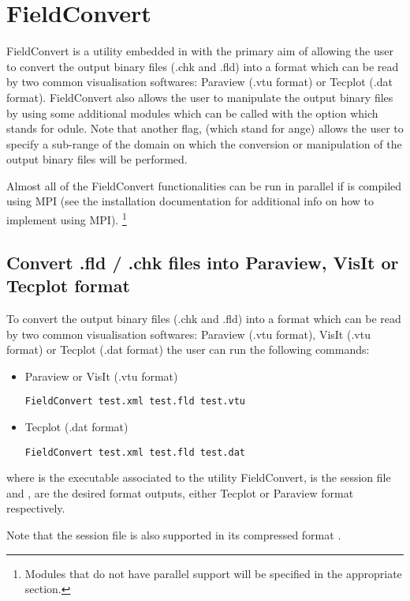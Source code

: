 \chapter{FieldConvert}
\label{s:utilities:fieldconvert}
FieldConvert is a utility embedded in \nekpp with the primary
aim of allowing the user to convert the \nekpp output binary files
(.chk and .fld) into a format which can be read by two common
visualisation softwares: Paraview (.vtu format) or Tecplot (.dat
format). FieldConvert also allows the user to manipulate the
\nekpp output binary files by using some additional modules
which can be called with the option  which stands
for odule. Note that another flag,  (which stand for
ange) allows the user to specify a sub-range of the domain
on which the conversion or manipulation of the \nekpp output binary
files will be performed.

Almost all of the FieldConvert functionalities can be run in parallel if \nekpp
is compiled using MPI (see the installation documentation for additional info on
how to implement \nekpp using MPI). \footnote{Modules that do not have parallel
  support will be specified in the appropriate section.}
%
%
%
\section{Convert .fld / .chk files into Paraview, VisIt or Tecplot format}
\label{s:utilities:fieldconvert:sub:convert}
To convert the \nekpp output binary files (.chk and .fld) into a
format which can be read by two common visualisation softwares:
Paraview (.vtu format), VisIt (.vtu format) or Tecplot (.dat format)
the user can run the following commands:
%
\begin{itemize}
\item Paraview or VisIt (.vtu format)
%
\begin{lstlisting}[style=BashInputStyle]
FieldConvert test.xml test.fld test.vtu
\end{lstlisting}
%
\item Tecplot (.dat format)
%
\begin{lstlisting}[style=BashInputStyle]
FieldConvert test.xml test.fld test.dat
\end{lstlisting}
%
\end{itemize}
%
where  is the executable associated to the utility
FieldConvert,  is the session file and ,
 are the desired format outputs, either Tecplot or
Paraview format respectively.
%
\begin{tipbox}
Note that the session file is also supported
in its compressed format .
\end{tipbox}
%
%
%
